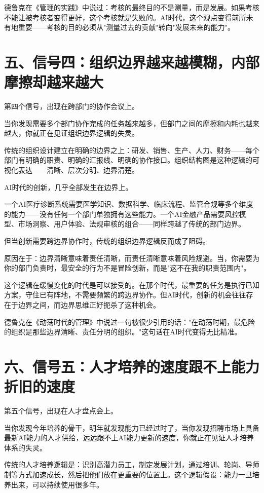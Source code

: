 德鲁克在《管理的实践》中说过：考核的最终目的不是测量，而是发展。如果考核不能让被考核者变得更好，这个考核就是失败的。AI时代，这个观点变得前所未有地重要——考核的目的必须从"测量过去的贡献"转向"发展未来的能力"。


\section{五、信号四：组织边界越来越模糊，内部摩擦却越来越大}


第四个信号，出现在跨部门的协作会议上。

当你发现需要多个部门协作完成的任务越来越多，但部门之间的摩擦和内耗也越来越大，你就正在见证组织边界逻辑的失灵。

传统的组织设计建立在明确的边界之上：研发、销售、生产、人力、财务——每个部门有明确的职责、明确的汇报线、明确的协作接口。组织结构图是这种逻辑的可视化表达——清晰、层次分明、边界清楚。

AI时代的创新，几乎全部发生在边界上。

一个AI医疗诊断系统需要医学知识、数据科学、临床流程、监管合规等多个维度的能力——没有任何一个部门单独拥有这些能力。一个AI金融产品需要风控模型、市场洞察、用户体验、法规审核的组合——同样跨越了传统的部门边界。

但当创新需要跨边界协作时，传统的组织边界逻辑反而成了阻碍。

原因在于：边界清晰意味着责任清晰，而责任清晰意味着风险规避。当，你需要为你的部门负责时，最安全的行为不是冒险创新，而是"这不在我的职责范围内"。

这个逻辑在缓慢变化的时代是可以接受的。在那个时代，最重要的任务是执行已知方案，守住已有阵地，不需要频繁的跨边界协作。但AI时代，创新的机会往往存在于边界之间，而边界思维正好扼杀了这种机会。

德鲁克在《动荡时代的管理》中说过一句被很少引用的话："在动荡时期，最危险的组织是那些边界清晰、责任分明的组织。"这句话在AI时代变得无比精准。


\section{六、信号五：人才培养的速度跟不上能力折旧的速度}


第五个信号，出现在人才盘点会上。

当你发现今年培养的骨干，明年就发现能力已经过时了，当你发现招聘市场上具备最新AI能力的人才供给，远远跟不上AI能力更新的速度，你就正在见证人才培养体系的失灵。

传统的人才培养逻辑是：识别高潜力员工，制定发展计划，通过培训、轮岗、导师制等方式加速成长，然后把他们放在更重要的位置上。这个逻辑假设：能力一旦培养出来，可以持续使用很多年。

